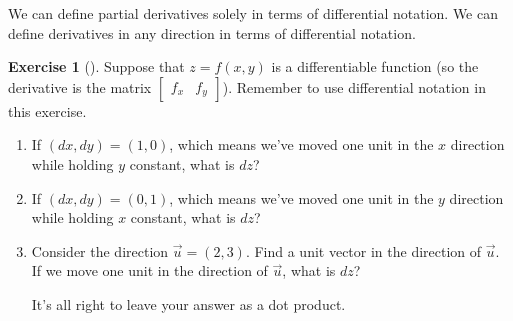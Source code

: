\documentclass[10pt,]{book}
\theoremstyle{plain}
\theoremstyle{definition}
\theoremstyle{definition}
\theoremstyle{definition}
\theoremstyle{definition}
\newtheorem{exploration}[project]{Exercise}
\theoremstyle{definition}
\numberwithin{equation}{section}
\newcommand{\amp}{&}
\begin{document}
We can define partial derivatives solely in terms of differential notation. We can define derivatives in any direction in terms of differential notation.%
\begin{exploration}[]\label{exploration-225}
Suppose that \(z=f(x,y)\) is a differentiable function (so the derivative is the matrix \(\begin{bmatrix}f_x\amp f_y
\end{bmatrix}\)). Remember to use differential notation in this exercise.%
\begin{enumerate}[font=\bfseries,label=(\alph*),ref=\alph*]
\item\label{task-609} If \((dx,dy)=(1,0)\), which means we've moved one unit in the \(x\) direction while holding \(y\) constant, what is \(dz\)?%
\item\label{task-610} If \((dx,dy)=(0,1)\), which means we've moved one unit in the \(y\) direction while holding \(x\) constant, what is \(dz\)?%
\item\label{task-611} Consider the direction \(\vec u=(2,3)\).  Find a unit vector in the direction of \(\vec u\).  If we move one unit in the direction of \(\vec u\), what is \(dz\)?%
\par
It's all right to leave your answer as a dot product.%
\end{enumerate}
\end{exploration}
\typeout{************************************************}
\typeout{************************************************}
\end{document}
